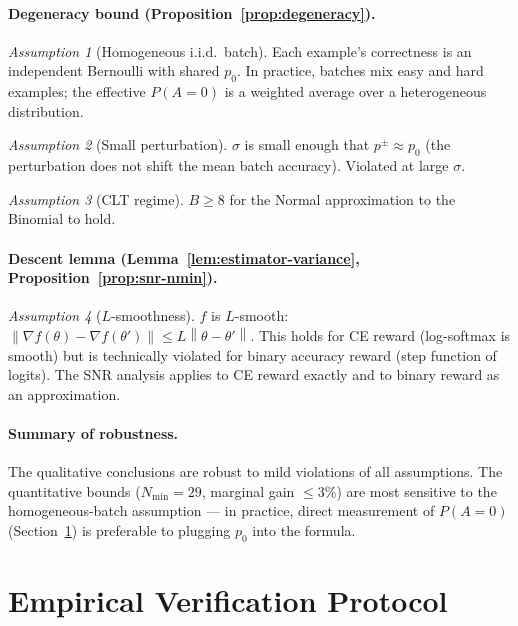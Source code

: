 \documentclass[11pt]{article}
\theoremstyle{definition}
\theoremstyle{remark}
\newtheorem{assumption}{Assumption}
\newcommand{\norm}[1]{\left\|#1\right\|}
\newcommand{\Nmin}{N_{\mathrm{min}}}
\begin{document}
\paragraph{Degeneracy bound (Proposition~\ref{prop:degeneracy}).}
\begin{assumption}[Homogeneous i.i.d.\ batch]
Each example's correctness is an independent Bernoulli with shared $p_0$. In practice, batches mix easy and hard examples; the effective $P(A=0)$ is a weighted average over a heterogeneous distribution.
\end{assumption}
\begin{assumption}[Small perturbation]
$\sigma$ is small enough that $p^\pm \approx p_0$ (the perturbation does not shift the mean batch accuracy). Violated at large $\sigma$.
\end{assumption}
\begin{assumption}[CLT regime]
$B \geq 8$ for the Normal approximation to the Binomial to hold.
\end{assumption}

\paragraph{Descent lemma (Lemma~\ref{lem:estimator-variance}, Proposition~\ref{prop:snr-nmin}).}
\begin{assumption}[$L$-smoothness]
$f$ is $L$-smooth: $\norm{\nabla f(\theta) - \nabla f(\theta')} \leq L\norm{\theta-\theta'}$. This holds for CE reward (log-softmax is smooth) but is technically violated for binary accuracy reward (step function of logits). The SNR analysis applies to CE reward exactly and to binary reward as an approximation.
\end{assumption}

\paragraph{Summary of robustness.}
The qualitative conclusions are robust to mild violations of all assumptions. The quantitative bounds ($\Nmin = 29$, marginal gain $\leq 3\%$) are most sensitive to the homogeneous-batch assumption --- in practice, direct measurement of $P(A=0)$ (Section~\ref{sec:empirical-probe}) is preferable to plugging $p_0$ into the formula.

\section{Empirical Verification Protocol}
\label{sec:empirical-probe}
\end{document}
